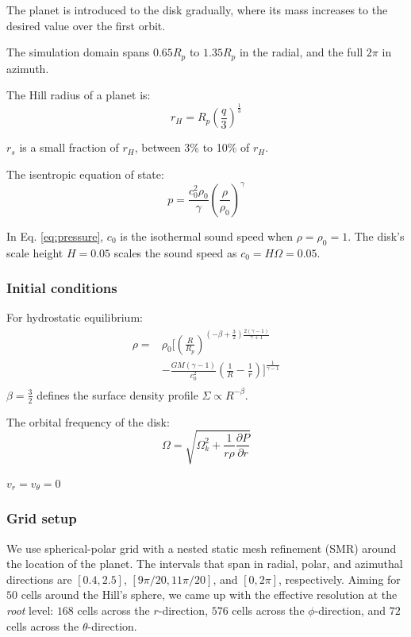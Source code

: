 \documentclass[twocolumn]{aastex631}
\begin{document}
The planet is introduced to the disk gradually, where its mass increases to the desired value over the first orbit.

The simulation domain spans $0.65R_p$ to $1.35R_p$ in the radial, and the full $2\pi$ in azimuth.

The Hill radius of a planet is:
\begin{equation}\label{eq:Hill}
    r_H=R_p\left(\frac{q}{3}\right)^{\frac{1}{3}}
\end{equation}

$r_s$ is a small fraction of $r_H$, between 3\% to 10\% of $r_H$.

The isentropic equation of state:
\begin{equation}\label{eq:pressure}
    p = \frac{c_0^2\rho_0}{\gamma}\left(\frac{\rho}{\rho_0}\right)^\gamma
\end{equation}

In Eq. \ref{eq:pressure}, $c_0$ is the isothermal sound speed when $\rho=\rho_0=1$. 
The disk's scale height $H = 0.05$ scales the sound speed as $c_0 = H\Omega=0.05$.

\subsubsection{Initial conditions}
For hydrostatic equilibrium:
\begin{equation}\label{eq:density}
\begin{aligned}
     \rho = & \rho_0 \bigg[\left(\frac{R}{R_p}\right)^{(-\beta+\frac{3}{2})\frac{2(\gamma-1)}{\gamma+1}} \\ 
    & - \frac{GM(\gamma-1)}{c_0^2}\left(\frac{1}{R}-\frac{1}{r}\right)\bigg]^{\frac{1}{\gamma-1}} \\
\end{aligned}
\end{equation}
$\beta=\frac{3}{2}$ defines the surface density profile $\Sigma\propto R^{-\beta}$.

The orbital frequency of the disk:
\begin{equation}\label{eq:omegadisk}
    \Omega = \sqrt{\Omega_k^2+\frac{1}{r\rho}\frac{\partial P}{\partial r}}
\end{equation}

$v_r=v_\theta=0$

\subsubsection{Grid setup}
We use spherical-polar grid with a nested static mesh refinement (SMR) around the location of the planet. The intervals that span in radial, polar, and azimuthal
directions are $[0.4, 2.5]$, $[9\pi/20, 11\pi/20]$, and $[0, 2\pi]$, respectively. Aiming for $50$ cells around the Hill's sphere, we came up with the 
effective resolution at the \emph{root} level: $168$ cells across the $r$-direction, $576$ cells across the $\phi$-direction, 
and $72$ cells across the $\theta$-direction.
\end{document}
